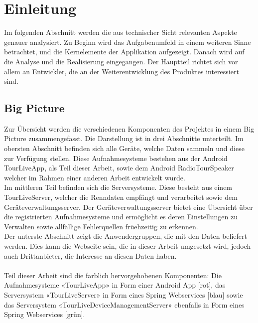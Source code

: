 \chapter{Einleitung}

Im folgenden Abschnitt werden die aus technischer Sicht relevanten Aspekte genauer analysiert. Zu Beginn wird das Aufgabenumfeld in einem weiteren Sinne betrachtet, und die Kernelemente der Applikation aufgezeigt. Danach wird auf die Analyse und die Realisierung eingegangen. Der Hauptteil richtet sich vor allem an Entwickler, die an der Weiterentwicklung des Produktes interessiert sind.

\section{Big Picture}

Zur Übersicht werden die verschiedenen Komponenten des Projektes in einem Big Picture zusammengefasst.
Die Darstellung ist in drei Abschnitte unterteilt. Im obersten Abschnitt befinden sich alle Geräte, welche Daten sammeln und diese zur Verfügung stellen. Diese Aufnahmesysteme bestehen aus der Android TourLiveApp, als Teil dieser Arbeit, sowie dem Android RadioTourSpeaker welcher im Rahmen einer anderen Arbeit entwickelt wurde. \\
Im mittleren Teil befinden sich die Serversysteme. Diese besteht aus einem TourLiveServer, welcher die Renndaten empfängt und verarbeitet sowie dem Geräteverwaltungsserver. Der Geräteverwaltungsserver bietet eine Übersicht über die registrierten Aufnahmesysteme und ermöglicht es deren Einstellungen zu Verwalten sowie allfällige Fehlerquellen früehzeitig zu erkennen.\\
Der unterste Abschnitt zeigt die Anwendergruppen, die mit den Daten beliefert werden. Dies kann die Webseite sein, die in dieser Arbeit umgesetzt wird, jedoch auch Drittanbieter, die Interesse an diesen Daten haben.\\
\\
Teil dieser Arbeit sind die farblich hervorgehobenen Komponenten: Die Aufnahmesysteme «TourLiveApp» in Form einer Android App [rot], das Serversystem «TourLiveServer» in Form eines Spring Webservices [blau] sowie das Serversystem «TourLiveDeviceManagementServer» ebenfalls in Form eines Spring Webservices [grün].

